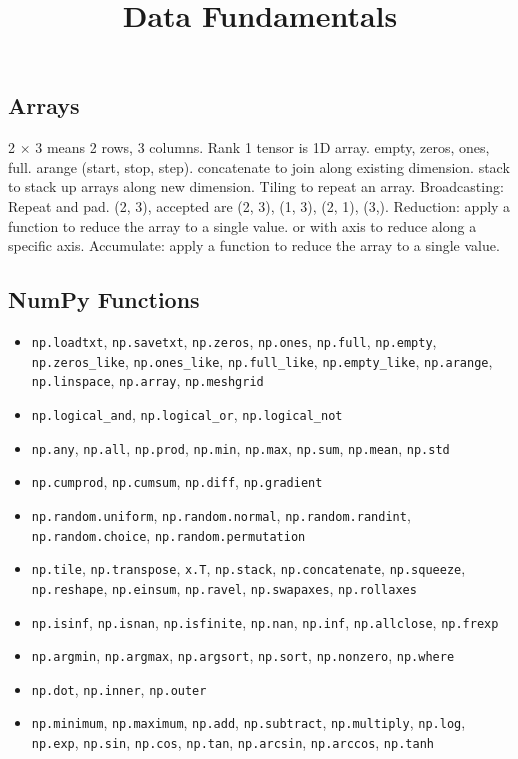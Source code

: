 \documentclass{article}
\title{Data Fundamentals}
\author{}
\date{}
\begin{document}
\small

\subsection*{Arrays}

2 $\times$ 3 means 2 rows, 3 columns.
Rank 1 tensor is 1D array.
empty, zeros, ones, full.
arange (start, stop, step).
concatenate to join along existing dimension.
stack to stack up arrays along new dimension.
Tiling to repeat an array.
Broadcasting: 
Repeat and pad.
(2, 3), accepted are (2, 3), (1, 3), (2, 1), (3,).
Reduction: apply a function to reduce the array to a single value.
or with axis to reduce along a specific axis.
Accumulate: apply a function to reduce the array to a single value.

\subsection*{NumPy Functions}
\begin{itemize}
    \item \texttt{np.loadtxt}, \texttt{np.savetxt}, \texttt{np.zeros}, \texttt{np.ones}, \texttt{np.full}, \texttt{np.empty}, \texttt{np.zeros\_like}, \texttt{np.ones\_like}, \texttt{np.full\_like}, \texttt{np.empty\_like}, \texttt{np.arange}, \texttt{np.linspace}, \texttt{np.array}, \texttt{np.meshgrid}
    \item \texttt{np.logical\_and}, \texttt{np.logical\_or}, \texttt{np.logical\_not}
    \item \texttt{np.any}, \texttt{np.all}, \texttt{np.prod}, \texttt{np.min}, \texttt{np.max}, \texttt{np.sum}, \texttt{np.mean}, \texttt{np.std}
    \item \texttt{np.cumprod}, \texttt{np.cumsum}, \texttt{np.diff}, \texttt{np.gradient}
    \item \texttt{np.random.uniform}, \texttt{np.random.normal}, \texttt{np.random.randint}, \texttt{np.random.choice}, \texttt{np.random.permutation}
    \item \texttt{np.tile}, \texttt{np.transpose}, \texttt{x.T}, \texttt{np.stack}, \texttt{np.concatenate}, \texttt{np.squeeze}, \texttt{np.reshape}, \texttt{np.einsum}, \texttt{np.ravel}, \texttt{np.swapaxes}, \texttt{np.rollaxes}
    \item \texttt{np.isinf}, \texttt{np.isnan}, \texttt{np.isfinite}, \texttt{np.nan}, \texttt{np.inf}, \texttt{np.allclose}, \texttt{np.frexp}
    \item \texttt{np.argmin}, \texttt{np.argmax}, \texttt{np.argsort}, \texttt{np.sort}, \texttt{np.nonzero}, \texttt{np.where}
    \item \texttt{np.dot}, \texttt{np.inner}, \texttt{np.outer}
    \item \texttt{np.minimum}, \texttt{np.maximum}, \texttt{np.add}, \texttt{np.subtract}, \texttt{np.multiply}, \texttt{np.log}, \texttt{np.exp}, \texttt{np.sin}, \texttt{np.cos}, \texttt{np.tan}, \texttt{np.arcsin}, \texttt{np.arccos}, \texttt{np.tanh}
\end{itemize}
\end{document}
